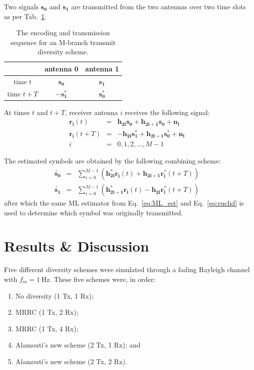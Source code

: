 \documentclass[journal]{IEEEtran}
\begin{document}
Two signals $\pmb{s_0}$ and $\pmb{s_1}$ are transmitted from the two antennas over two time slots as per Tab.~\ref{tab:tx_seq}.

\begin{table}
\begin{center}
\begin{tabular}{c|c|c|}
\hline
 & antenna 0 & antenna 1 \\ 
\hline 
time $t$ & $\pmb{s_0}$ & $\pmb{s_1}$ \\ 
\hline 
time $t + T$ & $\pmb{-s_1^*}$ & $\pmb{s_0^*}$ \\
\hline
\end{tabular} 
\end{center}
\caption{The encoding and transmission sequence for an M-branch transmit diversity scheme. \label{tab:tx_seq}}
\end{table}

At times $t$ and $t + T$, receiver antenna $i$ receives the following signal:
\begin{eqnarray}
\pmb{r_i}(t) &=& \pmb{h_{2i} s_0} + \pmb{h_{2i + 1} s_0} + \pmb{n_i} \nonumber \\
\pmb{r_i}(t+T) &=& -\pmb{h_{2i} s_1^*} + \pmb{h_{2i + 1} s_0^*} + \pmb{n_i} \nonumber \\
i &=& 0,1,2,\ldots , M-1
\end{eqnarray}

The estimated symbols are obtained by the following combining scheme:
\begin{eqnarray}
\pmb{\tilde{s_0}} &=& \sum^{M-1}_{i=0} \left( \pmb{h_{2i}^* r_{i}}(t) + \pmb{h_{2i+1} r_{i}^*}(t+T) \right) \nonumber \\
\pmb{\tilde{s_1}} &=& \sum^{M-1}_{i=0} \left( \pmb{h_{2i+1}^* r_{i}}(t) - \pmb{h_{2i} r_{i}^*}(t+T) \right)
\end{eqnarray}
after which the same ML estimator from Eq.~\ref{eq:ML_est} and Eq.~\ref{eq:euclid} is used to determine which symbol was originally transmitted.

\section{Results \& Discussion}
Five different diversity schemes were simulated through a fading Rayleigh channel with $f_m = 1~\text{Hz}$. These five schemes were, in order:
\begin{enumerate}
\item No diversity (1 Tx, 1 Rx);
\item MRRC (1 Tx, 2 Rx);
\item MRRC (1 Tx, 4 Rx);
\item Alamouti's new scheme (2 Tx, 1 Rx); and
\item Alamouti's new scheme (2 Tx, 2 Rx).
\end{enumerate}
\end{document}
